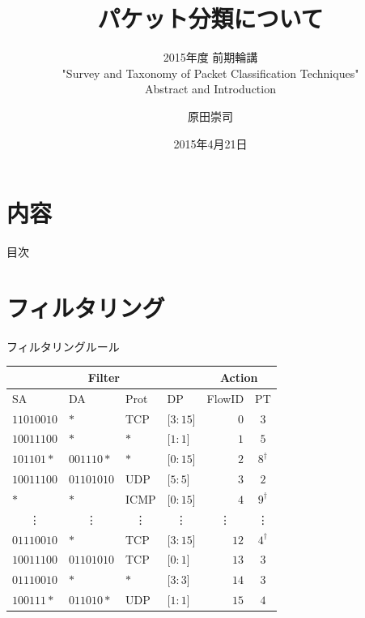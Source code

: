 \documentclass[12pt,dvipdfmx,mathserif,uplatex,aspectratio=32]{beamer}
\title{パケット分類について}
\subtitle{2015年度 前期輪講 \\ "Survey and Taxonomy of Packet Classification Techniques" \\ Abstract and Introduction}
\author{原田崇司}
\date[]{2015年4月21日}
\institute[所属]{神奈川大学大学院 理学研究科 情報科学専攻 田中研究室}
\begin{document}
\frame{\maketitle}

\section*{内容}


\begin{frame}{目次}
  \tableofcontents
\end{frame}



\section{フィルタリング}


\begin{frame}{フィルタリングルール}

\begin{table}
 \begin{tabular}{|l|l|l|l||r|c|} \hline
 \multicolumn{4}{|c||}{Filter} & \multicolumn{2}{|c|}{Action} \\ \hline
 SA & DA & Prot & DP & FlowID & PT  \\ \hline
 $11010010$ & $*$        & TCP  & [$3:15$] & $0$  & $3$  \\
 $10011100$ & $*$        & $*$  & [$1:1$]  & $1$  & $5$ \\
 $101101*$  & $001110*$  & $*$  & [$0:15$] & $2$  & $8^{\dagger}$ \\
 $10011100$ & $01101010$ & UDP  & [$5:5$]  & $3$  & $2$ \\
 $*$        & $*$        & ICMP & [$0:15$] & $4$  & $9^{\dagger}$ \\
 \multicolumn{1}{|c}{\vdots} & \multicolumn{1}{|c}{\vdots} & \multicolumn{1}{|c}{\vdots} & \multicolumn{1}{|c||}{\vdots} & \multicolumn{1}{|c}{\vdots} & \multicolumn{1}{|c|}{\vdots} \\
 $01110010$ & $*$        & TCP  & [$3:15$] & $12$ & $4^{\dagger}$\\
 $10011100$ & $01101010$ & TCP  & [$0:1$]  & $13$ & $3$ \\
 $01110010$ & $*$        & $*$  & [$3:3$]  & $14$ & $3$ \\
 $100111*$  & $011010*$  & UDP  & [$1:1$]  & $15$ & $4$ \\ \hline
 \end{tabular}
\end{table}

\end{frame}
\end{document}
